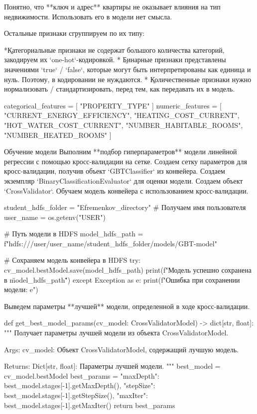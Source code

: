 \p Понятно, что **ключ и адрес** квартиры не оказывает влияния на тип недвижимости. Использовать его в модели нет смысла.

Остальные признаки сгруппируем по их типу:

*\b{Категориальные} признаки не содержат большого количества категорий, закодируем их `one-hot`-кодировкой.
* \b{Бинарные} признаки представлены значениями `true` / `false`, которые могут быть интерпретированы как единица и нуль. Поэтому, в кодировании не нуждаются.
* \b{Количественные} признаки нужно нормализовать / стандартизировать, перед тем, как передавать их в модель.

\begin{code}
categorical_features = [ "PROPERTY_TYPE" ]
numeric_features = [
    "CURRENT_ENERGY_EFFICIENCY", "HEATING_COST_CURRENT", "HOT_WATER_COST_CURRENT", "NUMBER_HABITABLE_ROOMS", "NUMBER_HEATED_ROOMS"
]
\end{code}

\p Обучение модели
Выполним **подбор гиперпараметров** модели линейной регрессии с помощью кросс-валидации на сетке.
Создаем сетку параметров для кросс-валидации, получив объект `GBTClassifier` из конвейера.
Создаем экземпляр `BinaryClassificationEvaluator` для оценки модели.
Создаем объект `CrossValidator`.
Обучаем модель конвейера с использованием кросс-валидации.

\begin{code}
student_hdfs_folder = "Efremenkov_directory"
# Получаем имя пользователя
user_name = os.getenv("USER")

# Путь модели в HDFS
model_hdfs_path = f"hdfs:///user/{user_name}/{student_hdfs_folder}/models/GBT-model"

# Сохраняем модель конвейера в HDFS
try:
    cv_model.bestModel.save(model_hdfs_path)
    print(f"Модель успешно сохранена в \"{model_hdfs_path}\"")
except Exception as e:
    print(f"Ошибка при сохранении модели: {e}")
\end{code}

\p Выведем параметры **лучшей** модели, определенной в ходе кросс-валидации.

\begin{code}
def get_best_model_params(cv_model: CrossValidatorModel) -> dict[str, float]:
    """
    Получает параметры лучшей модели из объекта CrossValidatorModel.

    Args:
        cv_model: Объект CrossValidatorModel, содержащий лучшую модель.

    Returns:
        Dict[str, float]: Параметры лучшей модели.
    """
    best_model = cv_model.bestModel
    best_params = {
        "maxDepth": best_model.stages[-1].getMaxDepth(),
        "stepSize": best_model.stages[-1].getStepSize(),
        "maxIter": best_model.stages[-1].getMaxIter()
    }
    return best_params
\end{code}

